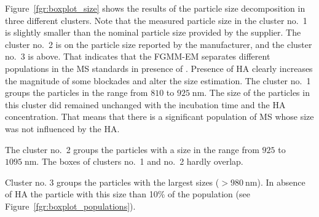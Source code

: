 \documentclass[journal=langd5,manuscript=article]{achemso}
\begin{document}

Figure~\ref{fgr:boxplot_size} shows the results of the particle size decomposition in three different clusters. Note that the measured particle size in the cluster no.~1 is slightly smaller than the nominal particle size provided by the supplier. 
The cluster no.~2 is on the particle size reported by the manufacturer, and the cluster no.~3 is above. That indicates that the FGMM-EM separates different populations in the MS standards in presence of . Presence of HA clearly increases the  magnitude of some blockades and alter the size estimation.
The cluster no.~1 groups the particles in the range from $810$ to $925\;\mathrm{nm}$. The size of the particles in this cluster did remained unchanged with the incubation time and the HA concentration. That means that there is a significant population of MS whose size was not influenced by the HA.


The cluster no.~2 groups the particles with a size in the range from $925$ to $1095\;\mathrm{nm}$. The boxes of clusters no.~1 and no.~2 hardly overlap. 


Cluster no. 3 groups the particles with the largest sizes ($> 980~\mathrm{nm}$). 
In absence of HA the particle with this size than 10\% of the population  (see Figure~\ref{fgr:boxplot_populations}).

\end{document}
